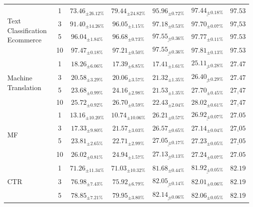\documentclass{article}
\begin{document}
\begin{longtable}{@{}p{}cccccc@{}}
\midrule
\multirow{4}{=}{Text Classification Ecommerce} 
& 1 & $73.46_{\pm26.12\%}$ & $79.44_{\pm24.82\%}$ & $95.96_{\pm0.72\%}$ & $\underline{97.44_{\pm0.18\%}}$ & $\mathbf{97.53}$ \\
& 3 & $91.40_{\pm14.26\%}$ & $96.05_{\pm1.15\%}$ & $97.18_{\pm0.53\%}$ & $\mathbf{97.70_{\pm0.07\%}}$ & $\underline{97.53}$ \\
& 5 & $96.04_{\pm1.84\%}$ & $96.68_{\pm0.73\%}$ & $\underline{97.55_{\pm0.36\%}}$ & $\mathbf{97.77_{\pm0.11\%}}$ & $97.53$ \\
& 10 & $97.47_{\pm0.18\%}$ & $97.21_{\pm0.50\%}$ & $\underline{97.55_{\pm0.36\%}}$ & $\mathbf{97.81_{\pm0.13\%}}$ & $97.53$ \\
\midrule
\multirow{4}{=}{Machine Translation} 
& 1 & $18.26_{\pm6.06\%}$ & $17.39_{\pm6.85\%}$ & $17.41_{\pm1.61\%}$ & $\underline{25.11_{\pm0.28\%}}$ & $\mathbf{27.47}$ \\
& 3 & $20.58_{\pm3.29\%}$ & $20.06_{\pm3.57\%}$ & $21.32_{\pm1.35\%}$ & $\underline{26.40_{\pm0.29\%}}$ & $\mathbf{27.47}$ \\
& 5 & $23.68_{\pm0.99\%}$ & $24.16_{\pm2.98\%}$ & $21.53_{\pm1.35\%}$ & $\mathbf{27.70_{\pm0.45\%}}$ & $\underline{27.47}$ \\
& 10 & $25.72_{\pm0.92\%}$ & $26.70_{\pm0.59\%}$ & $22.43_{\pm2.04\%}$ & $\mathbf{28.02_{\pm0.61\%}}$ & $\underline{27.47}$ \\
\midrule
\multirow{4}{=}{MF} 
& 1 &  $13.16_{\pm10.20\%}$ & $10.74_{\pm10.06\%}$ & $26.21_{\pm0.57\%}$ & $\underline{26.92_{\pm0.07\%}}$ & $\mathbf{27.05}$ \\
& 3  & $17.33_{\pm9.80\%}$ & $21.57_{\pm3.03\%}$  & $26.57_{\pm0.65\%}$ & $\mathbf{27.14_{\pm0.04\%}}$ & $\underline{27.05}$ \\
& 5 & $23.81_{\pm2.65\%}$ & $22.71_{\pm2.99\%}$  & $\underline{27.05_{\pm0.17\%}}$ & $\mathbf{27.23_{\pm0.05\%}}$ & $\underline{27.05}$ \\
& 10 & $26.02_{\pm0.81\%}$ & $24.94_{\pm1.57\%}$ & $\underline{27.13_{\pm0.13\%}}$ & $\mathbf{27.24_{\pm0.07\%}}$ & $27.05$ \\
\midrule
\multirow{4}{=}{CTR} 
& 1 & $71.26_{\pm11.34\%}$ & $71.03_{\pm10.32\%}$ & $81.68_{\pm0.44\%}$ & $\underline{81.92_{\pm0.05\%}}$ & $\mathbf{82.19}$ \\
& 3 & $76.98_{\pm7.43\%}$  & $75.92_{\pm6.79\%}$  & $\underline{82.05_{\pm0.14\%}}$ & $82.01_{\pm0.06\%}$ & $\mathbf{82.19}$ \\
& 5 & $78.85_{\pm7.21\%}$  & $79.95_{\pm3.80\%}$  & $\underline{82.14_{\pm0.06\%}}$ & $82.06_{\pm0.05\%}$ & $\mathbf{82.19}$ \\

\end{longtable}
\end{document}
